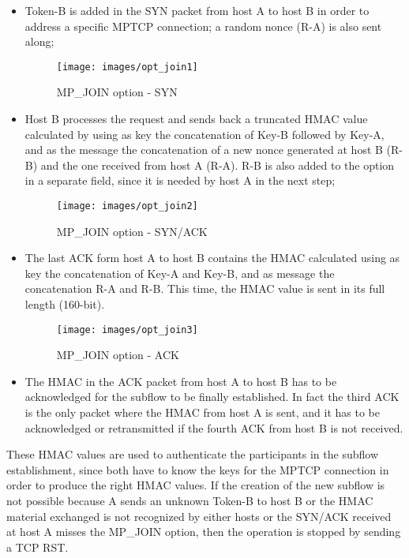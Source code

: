 \begin{itemize}
  \item Token-B is added in the SYN packet from host A to host B in order to address a specific MPTCP connection; a random nonce (R-A) is also sent along;

\begin{figure}[!htb]
\centering
\texttt{[image: images/opt\_join1]}
\caption{MP\_JOIN option - SYN}
\label{fig:opt_join1}
\end{figure}

  \item Host B processes the request and sends back a truncated HMAC value calculated by using as key the concatenation of Key-B followed by Key-A, and as the message the concatenation of a new nonce generated at host B (R-B) and the one received from host A (R-A). R-B is also added to the option in a separate field, since it is needed by host A in the next step;

\begin{figure}[!htb]
\centering
\texttt{[image: images/opt\_join2]}
\caption{MP\_JOIN option - SYN/ACK}
\label{fig:opt_join2}
\end{figure}

  \item The last ACK form host A to host B contains the HMAC calculated using as key the concatenation of Key-A and Key-B, and as message the concatenation R-A and R-B. This time, the HMAC value is sent in its full length (160-bit).
\begin{figure}[!htb]
\centering
\texttt{[image: images/opt\_join3]}
\caption{MP\_JOIN option - ACK}
\label{fig:opt_join3}
\end{figure}
  \item The HMAC in the ACK packet from host A to host B has to be acknowledged for the subflow to be finally established. In fact the third ACK is the only packet where the HMAC from host A is sent, and it has to be acknowledged or retransmitted if the fourth ACK from host B is not received.
\end{itemize}

These HMAC values are used to authenticate the participants in the subflow establishment, since both have to know the keys for the MPTCP connection in order to produce the right HMAC values. If the creation of the new subflow is not possible because A sends an unknown Token-B to host B or the HMAC material exchanged is not recognized by either hosts or the SYN/ACK received at host A misses the MP\_JOIN option, then the operation is stopped by sending a TCP RST.

